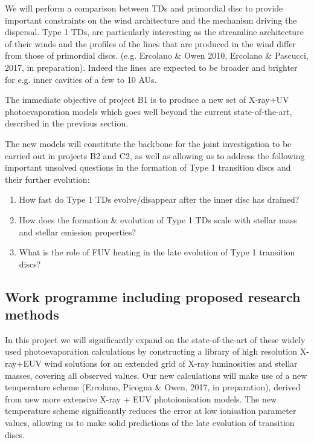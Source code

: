 \documentclass[10pt,fleqn,twoside]{article}
\newcommand{\Tcol}{\color{blue}}
\begin{document}
We will perform a comparison between TDs and
primordial disc to provide important constraints on the wind
architecture and the mechanism driving the dispersal. 
Type 1 TDs, are particularly interesting as the streamline architecture of their winds
and the profiles of the lines that are produced in the wind
differ from those of primordial discs. (e.g. Ercolano \& Owen
2010, Ercolano \& Pascucci, 2017, in preparation). Indeed the lines
are expected to be broader and brighter for e.g. inner cavities of a few to 10 AUs.  

The immediate objective of project B1 is to produce a new set of
X-ray+UV photoevaporation models which goes well beyond the current
state-of-the-art, described in the previous section. 

The new models will constitute the backbone for the joint
investigation to be carried out in projects B2 and C2, as well as
allowing us to address the following important unsolved questions in
the formation of Type 1 transition discs and their further evolution: 

\begin{enumerate}
\item How fast do Type 1 TDs evolve/disappear after the inner disc has
  drained?
\item How does the formation \& evolution of Type 1 TDs scale with
  stellar mass and stellar emission properties?
\item What is the role of FUV heating in the late evolution of Type 1
  transition discs? 
\end{enumerate}



\subsection{\Tcol Work programme including proposed research methods}
In this project we will significantly expand on the state-of-the-art of these widely used
photoevaporation calculations by constructing a
library of high resolution X-ray+EUV wind solutions for an extended grid of
X-ray luminosities and stellar masses, covering all observed
values. Our new calculations will make use of a new temperature
scheme (Ercolano, Picogna \& Owen, 2017, in preparation), derived from
new more extensive X-ray + EUV photoionisation models.  The new
temperature scheme
significantly reduces the error at low ionisation parameter values,
allowing us to make solid predictions of the late evolution of
transition discs. 
\end{document}
